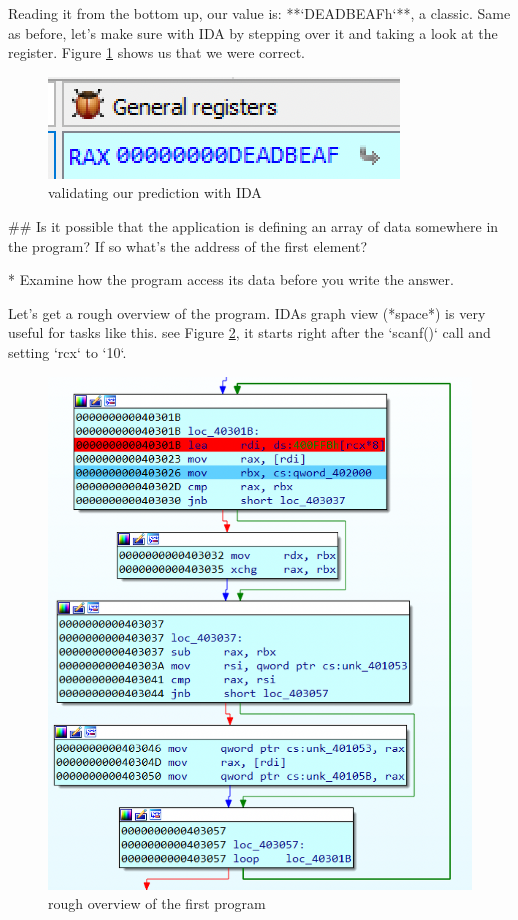 \begin{markdown}

Reading it from the bottom up, our value is: **`DEADBEAFh`**, a classic.
\n
Same as before, let's make sure with IDA by stepping over it and taking a look at the register. Figure \ref{pred} shows us that we were correct.
\n
\begin{figure}[!htbp]
\centering
\includegraphics[width=.45\linewidth]{media/pred.png}
\caption{validating our prediction with IDA}\label{pred}
\end{figure}

\clearpage
## Is it possible that the application is defining an array of data somewhere in the program? If so what’s the address of the first element?

* Examine how the program access its data before you write the answer.

\noindent\s Let's get a rough overview of the program. IDAs graph view (*space*) is very useful for tasks like this. see Figure \ref{structure}, it starts right after the `scanf()` call and setting `rcx` to `10`.


\begin{figure}[!htbp]
\centering
\includegraphics[width=.7\linewidth]{media/structure.png}
\caption{rough overview of the first program}\label{structure}
\end{figure}


\end{markdown}
